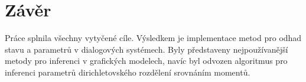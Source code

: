 \chapter*{Závěr}

Práce splnila všechny vytyčené cíle. 
Výsledkem je implementace metod pro odhad stavu a parametrů v dialogových systémech.
Byly představeny nejpoužívanější metody pro inferenci v grafických modelech, navíc byl odvozen algoritmus pro inferenci parametrů dirichletovského rozdělení srovnáním momentů.